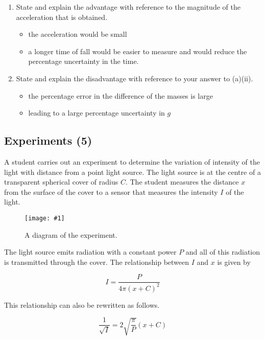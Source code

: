 \documentclass[a4paper,12pt]{article}
\let\oldsubsection\subsection
\renewcommand\subsection{\clearpage\oldsubsection}
\newcommand{\img}[4]{\begin{center}
  \begin{figure}[H]
    \centering
    \texttt{[image: \#1]}
    \caption{#3}
    \label{fig:#4}
  \end{figure}
\end{center}}
\begin{document}
\begin{enumerate}[label=(\alph*)]
        \begin{enumerate}[label=(\roman*)]
          \item State and explain the advantage with reference to the magnitude of the acceleration that is obtained.
                \begin{itemize}
                  \item the acceleration would be small
                  \item a longer time of fall would be easier to measure and would reduce the percentage uncertainty in the time.
                \end{itemize}
          \item State and explain the disadvantage with reference to your answer to (a)(ii).
                \begin{itemize}
                  \item the percentage error in the difference of the masses is large
                  \item leading to a large percentage uncertainty in $g$
                \end{itemize}
        \end{enumerate}
\end{enumerate}

\subsection{Experiments (5)}

A student carries out an experiment to determine the variation of intensity of the light with distance from a point light source. The light source is at the centre of a transparent spherical cover of radius $C$. The student measures the distance $x$ from the surface of the cover to a sensor that measures the intensity $I$ of the light.

\img{ex/13.png}{0.7}{A diagram of the experiment.}{13}

The light source emits radiation with a constant power $P$ and all of this radiation is transmitted through the cover. The relationship between $I$ and $x$ is given by

\[
  I = \frac{P}{4\pi (x + C)^2}
\]

This relationship can also be rewritten as follows.

$$
  \frac{1}{\sqrt{I}} = 2\sqrt{\frac{\pi}{P}}(x + C)
$$
\end{document}
